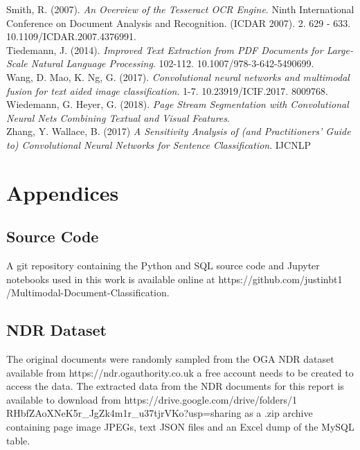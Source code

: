 \documentclass[a4paper,12pt]{article}
\begin{document}
\noindent Smith, R. (2007). \emph{An Overview of the Tesseract OCR Engine}. Ninth International Conference on Document Analysis and Recognition. (ICDAR 2007). 2. 629 - 633. 10.1109/ICDAR.2007.4376991.\\

\noindent Tiedemann, J. (2014). \emph{Improved Text Extraction from PDF Documents for Large-Scale Natural Language Processing}. 102-112. 10.1007/978-3-642-5490699.\\

\noindent Wang, D. Mao, K. Ng, G. (2017). \emph{Convolutional neural networks and multimodal fusion for text aided image classification}. 1-7. 10.23919/ICIF.2017.
8009768.\\

\noindent Wiedemann, G. Heyer, G. (2018). \emph{Page Stream Segmentation with Convolutional Neural Nets Combining Textual and Visual Features}.\\

\noindent Zhang, Y. Wallace, B. (2017)  \emph{A Sensitivity Analysis of (and Practitioners’ Guide to) Convolutional Neural Networks for Sentence Classification}. IJCNLP\\


\section{Appendices}
\subsection{Source Code}
A git repository containing the Python and SQL source code and Jupyter notebooks used in this work is available online at https://github.com/justinbt1
/Multimodal-Document-Classification.

\subsection{NDR Dataset}
The original documents were randomly sampled from the OGA NDR dataset available from https://ndr.ogauthority.co.uk a free account needs to be created to access the data. The extracted data from the NDR documents for this report is available to download from https://drive.google.com/drive/folders/1 RHbfZAoXNeK5r\_JgZk4m1r\_u37tjrVKo?usp=sharing as a .zip archive containing page image JPEGs, text JSON files and an Excel dump of the MySQL table.
\end{document}
